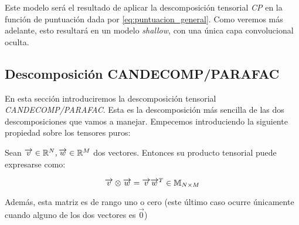 Este modelo será el resultado de aplicar la descomposición tensorial \textit{CP} en la función de puntuación dada por \eqref{eq:puntuacion_general}. Como veremos más adelante, esto resultará en un modelo \textit{shallow}, con una única capa convolucional oculta.

\subsection{Descomposición CANDECOMP/PARAFAC} \label{subs:descomposcion_cp}

En esta sección introduciremos la descomposición tensorial \textit{CANDECOMP/PARAFAC}. Esta es la descomposición más sencilla de las dos descomposiciones que vamos a manejar. Empecemos introduciendo la siguiente propiedad sobre los tensores puros:

\begin{proposicion}
	Sean $\overrightarrow{v} \in \mathbb{R}^{N}, \overrightarrow{w} \in \mathbb{R}^{M}$ dos vectores. Entonces su producto tensorial puede expresarse como:

	$$\overrightarrow{v} \otimes \overrightarrow{w} = \overrightarrow{v} \overrightarrow{w}^T \in \mathbb{M}_{N \times M}$$

	Además, esta matriz es de rango uno o cero (este último caso ocurre únicamente cuando alguno de los dos vectores es $\vec{0}$)
\end{proposicion}


